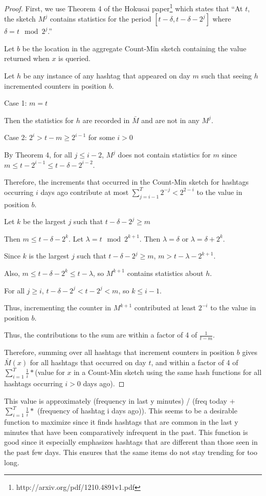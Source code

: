 \documentclass[a4paper,12pt]{article}
\begin{document}
\begin{proof}
First, we use Theorem 4 of the Hokusai paper\footnote{http://arxiv.org/pdf/1210.4891v1.pdf} which states that ``At $t$, the sketch $M^j$ contains statistics for the period $[t - \delta, t - \delta - 2^j]$ where $\delta = t \mod 2^j$.''

Let $b$ be the location in the aggregate Count-Min sketch containing the value returned when $x$ is queried.

Let $h$ be any instance of any hashtag that appeared on day $m$ such that seeing $h$ incremented counters in position $b$.

Case 1: $m=t$

Then the statistics for $h$ are recorded in $\bar{M}$ and are not in any $M^j$.

Case 2: $2^i > t-m \geq 2^{i-1}$ for some $i > 0$

By Theorem 4, for all $j \leq i - 2$, $M^j$ does not contain statistics for $m$ since $m \leq t - 2^{i-1} \leq t - \delta - 2^{i-2}$.

Therefore, the increments that occurred in the Count-Min sketch for hashtags occurring $i$ days ago contribute at most $\sum\limits_{j = i - 1}^{T} 2^{-j} < 2^{2-i}$ to the value in position $b$.

Let $k$ be the largest $j$ such that $t - \delta - 2^j \geq m$

Then $m \leq t - \delta - 2^k$.  Let $\lambda = t \mod 2^{k+1}$.  Then $\lambda = \delta$ or $\lambda = \delta + 2^k$.

Since $k$ is the largest $j$ such that $t - \delta - 2^j \geq m$, $m > t - \lambda - 2^{k+1}$.

Also, $m \leq t - \delta - 2^k \leq t - \lambda$, so $M^{k+1}$ contains statistics about $h$.

For all $j \geq i$, $t - \delta - 2^j < t - 2^j < m$, so $k \leq i - 1$. 

Thus, incrementing the counter in $M^{k + 1}$ contributed at least $2^{-i}$ to the value in position $b$.

Thus, the contributions to the sum are within a factor of 4 of $\frac{1}{t-m}$.

Therefore, summing over all hashtags that increment counters in position $b$ gives $\bar{M}(x)$ for all hashtags that occurred on day $t$, and within a factor of 4 of $\sum\limits_{i=1}^T \frac{1}{i}*$(value for $x$ in a Count-Min sketch using the same hash functions for all hashtags occurring $i > 0$ days ago). 
\end{proof}
This value is approximately (frequency in last y minutes) / (freq today + $\sum\limits_{i=1}^T \frac{1}{i} *$ (frequency of hashtag i days ago)).
This seems to be a desirable function to maximize since it finds hashtags that are common in the last y minutes that have been comparatively infrequent in the past.  This function is good since it especially emphasizes hashtags that are different than those seen in the past few days.  This ensures that the same items do not stay trending for too long. 
\end{document}
